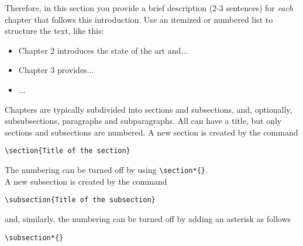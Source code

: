 Therefore, in this section you provide a brief description (2-3 sentences) for \emph{each} chapter that follows this introduction. Use an itemized or numbered list to structure the text, like this:

\begin{itemize}
\item[\Square]  Chapter 2 introduces the state of the art and...
\item[\Square]  Chapter 3 provides...
\item[\Square]  ...
\end{itemize}


Chapters are typically subdivided into sections and subsections, and, optionally,
subsubsections, paragraphs and subparagraphs.
All can have a title, but only sections and subsections are numbered.
A new section is created by the command
\begin{verbatim}
\section{Title of the section}
\end{verbatim}
The numbering can be turned off by using \verb|\section*{}|.
\\
A new subsection is created by the command
\begin{verbatim}
\subsection{Title of the subsection}
\end{verbatim}
and, similarly, the numbering can be turned off by adding an asterisk as follows 
\begin{verbatim}
\subsection*{}
\end{verbatim}

